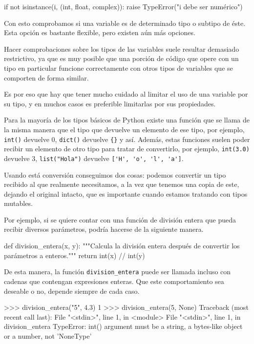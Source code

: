 \begin{codigo-python-sn}
if not isinstance(i, (int, float, complex)):
    raise TypeError("i debe ser numérico")
\end{codigo-python-sn}

Con esto comprobamos si una variable es de determinado tipo o subtipo de
éste. Esta opción es bastante flexible, pero existen aún más opciones.

\begin{atencion}
Hacer comprobaciones sobre los tipos de las variables suele resultar
demasiado restrictivo, ya que es muy posible que una porción de código que
opere con un tipo en particular funcione correctamente con otros tipos de
variables que se comporten de forma similar.

Es por eso que hay que tener mucho cuidado al limitar el uso de una
variable por su tipo, y en muchos casos es preferible limitarlas por sus
propiedades.
\end{atencion}

Para la mayoría de los tipos básicos de Python existe una función que se
llama de la misma manera que el tipo que devuelve un elemento de ese tipo,
por ejemplo, \lstinline!int()! devuelve 0, \lstinline!dict()! devuelve
\lstinline!{}! y así. Además, estas funciones suelen poder recibir un
elemento de otro tipo para tratar de convertirlo, por ejemplo,
\lstinline!int(3.0)! devuelve 3, \lstinline!list("Hola")! devuelve
\lstinline!['H', 'o', 'l', 'a']!.

Usando está conversión conseguimos dos cosas: podemos convertir un tipo
recibido al que realmente necesitamos, a la vez que tenemos una copia de
este, dejando el original intacto, que es importante cuando estamos
tratando con tipos mutables.

Por ejemplo, si se quiere contar con una función de división entera que
pueda recibir diversos parámetros, podría hacerse de la siguiente manera.

\begin{codigo-python-sn}
def division_entera(x, y):
    """Calcula la división entera después de convertir los parámetros a
    enteros."""
    return int(x) // int(y)
\end{codigo-python-sn}

De esta manera, la función \lstinline!division_entera! puede ser llamada
incluso con cadenas que contengan expresiones enteras. Que este
comportamiento sea deseable o no, depende siempre de cada caso.

\begin{codigo-python-sn}
>>> division_entera("5", 4.3)
1
>>> division_entera(5, None)
Traceback (most recent call last):
  File "<stdin>", line 1, in <module>
  File "<stdin>", line 1, in division_entera
TypeError: int() argument must be a string, a bytes-like object or a number, not 'NoneType'
\end{codigo-python-sn}

